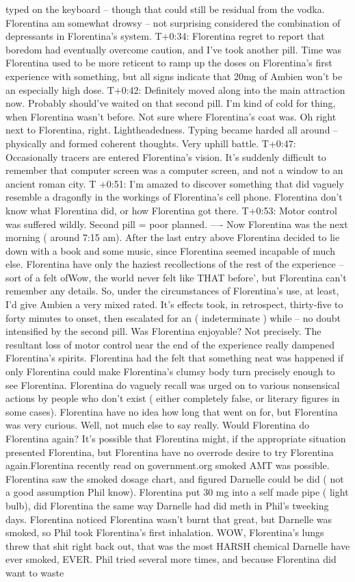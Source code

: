 \documentclass[12pt]{book}
\begin{document}
typed on the keyboard -- though that could still be residual from the vodka. Florentina am somewhat drowsy -- not surprising considered the combination of depressants in Florentina's system. T+0:34: Florentina regret to report that boredom had eventually overcome caution, and I've took another pill. Time was Florentina used to be more reticent to ramp up the doses on Florentina's first experience with something, but all signs indicate that 20mg of Ambien won't be an especially high dose. T+0:42: Definitely moved along into the main attraction now. Probably should've waited on that second pill. I'm kind of cold for thing, when Florentina wasn't before. Not sure where Florentina's coat was. Oh right next to Florentina, right. Lightheadedness. Typing became harded all around -- physically and formed coherent thoughts. Very uphill battle. T+0:47: Occasionally tracers are entered Florentina's vision. It's suddenly difficult to remember that computer screen was a computer screen, and not a window to an ancient roman city. T +0:51: I'm amazed to discover something that did vaguely resemble a dragonfly in the workings of Florentina's cell phone. Florentina don't know what Florentina did, or how Florentina got there. T+0:53: Motor control was suffered wildly. Second pill = poor planned. ---- Now Florentina was the next morning ( around 7:15 am). After the last entry above Florentina decided to lie down with a book and some music, since Florentina seemed incapable of much else. Florentina have only the haziest recollections of the rest of the experience -- sort of a felt ofWow, the world never felt like THAT before', but Florentina can't remember any details. So, under the circumstances of Florentina's use, at least, I'd give Ambien a very mixed rated. It's effects took, in retrospect, thirty-five to forty minutes to onset, then escalated for an ( indeterminate ) while -- no doubt intensified by the second pill. Was Florentina enjoyable? Not precisely. The resultant loss of motor control near the end of the experience really dampened Florentina's spirits. Florentina had the felt that something neat was happened if only Florentina could make Florentina's clumsy body turn precisely enough to see Florentina. Florentina do vaguely recall was urged on to various nonsensical actions by people who don't exist ( either completely false, or literary figures in some cases). Florentina have no idea how long that went on for, but Florentina was very curious. Well, not much else to say really. Would Florentina do Florentina again? It's possible that Florentina might, if the appropriate situation presented Florentina, but Florentina have no overrode desire to try Florentina again.Florentina recently read on government.org smoked AMT was possible. Florentina saw the smoked dosage chart, and figured Darnelle could be did ( not a good assumption Phil know). Florentina put 30 mg into a self made pipe ( light bulb), did Florentina the same way Darnelle had did meth in Phil's tweeking days. Florentina noticed Florentina wasn't burnt that great, but Darnelle was smoked, so Phil took Florentina's first inhalation. WOW, Florentina's lungs threw that shit right back out, that was the most HARSH chemical Darnelle have ever smoked, EVER. Phil tried several more times, and because Florentina did want to waste 
\end{document}
